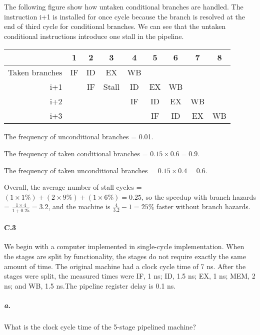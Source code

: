 \documentclass{article}
\begin{document}
The following figure show how untaken conditional branches are handled. The instruction i+1 is installed for once cycle because the branch is resolved at the end of third cycle for conditional branches. We can see that the untaken conditional instructions introduce one stall in the pipeline.

\begin{table}[ht!]
\begin{center}
\begin{tabular}{r|c|c|c|c|c|c|c|c} %
    \toprule
    &\textbf{1}&\textbf{2}&\textbf{3}&\textbf{4}&\textbf{5}&\textbf{6}&\textbf{7}&\textbf{8}\\
    \hline
    Taken branches&IF&ID&EX&WB&&&&\\
    \hline
    i+1&&IF&Stall&ID&EX&WB&\\
    \hline
    i+2&&&&IF&ID&EX&WB\\
    \hline
    i+3&&&&&IF&ID&EX&WB\\
    \bottomrule
    \end{tabular}
\end{center}
\end{table}

The frequency of unconditional branches = 0.01.

The frequency of taken conditional branches = $0.15\times 0.6=0.9$.

The frequency of taken unconditional branches = $0.15\times 0.4=0.6$.

Overall, the average number of stall cycles = $(1\times 1\%)+(2\times 9\%)+(1\times 6\%)=0.25$, so the speedup with branch hazards = $\frac{1\times 4}{1+0.25}=3.2$, and the machine is $\frac{4}{3.2}-1=25\%$ faster without branch hazards.

\paragraph{C.3} We begin with a computer implemented in single-cycle implementation. When the stages are split by functionality, the stages do not require exactly the same amount of time. The original machine had a clock cycle time of 7 ns. After the stages were split, the measured times were IF, 1 ns; ID, 1.5 ns; EX, 1 ns; MEM, 2 ns; and WB, 1.5 ns.The pipeline register delay is 0.1 ns.

\subparagraph{a.} What is the clock cycle time of the 5-stage pipelined machine? 
\end{document}
